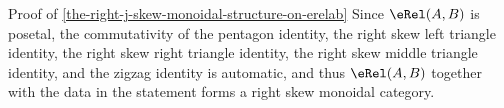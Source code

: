 \begin{Proof}{Proof of \cref{the-right-j-skew-monoidal-structure-on-erelab}}%
    Since $\eRel(A,B)$ is posetal, the commutativity of the pentagon identity, the right skew left triangle identity, the right skew right triangle identity, the right skew middle triangle identity, and the zigzag identity is automatic, and thus $\eRel(A,B)$ together with the data in the statement forms a right skew monoidal category.
\end{Proof}
\begin{appendices}

\end{appendices}


